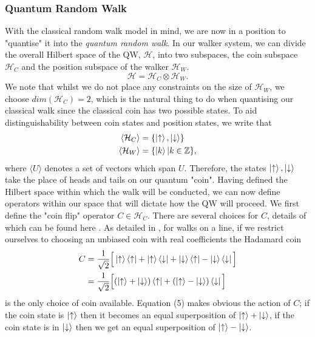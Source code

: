 \subsubsection{Quantum Random Walk}
With the classical random walk model in mind, we are now in a position to "quantise" it into the \emph{quantum random walk}.
In our walker system, we can divide the overall Hilbert space of the QW, $\mathcal{H}$, into two subspaces, the coin subspace $\mathcal{H}_C$ and the position subspace of the walker $\mathcal{H}_W$. 
\begin{equation}
    \mathcal{H} = \mathcal{H}_C \otimes \mathcal{H}_W.
\end{equation}
We note that whilst we do not place any constraints on the size of $\mathcal{H}_W$, we choose $dim(\mathcal{H}_C) = 2$, which is the natural thing to do when quantising our classical walk since the classical coin has two possible states. 
To aid distinguishability between coin states and position states, we write that
\begin{align}
    \langle\mathcal{H}_C\rangle &= \{\ket{\uparrow}, \ket{\downarrow}\}\\
    \langle\mathcal{H}_W\rangle &= \{\ket{k} | k\in\mathbb{Z}\},
\end{align}
where $\langle U \rangle$ denotes a set of vectors which span $U$. 
Therefore, the states $\ket{\uparrow}, \ket{\downarrow}$ take the place of heads and tails on our quantum "coin". 
Having defined the Hilbert space within which the walk will be conducted, we can now define operators within our space that will dictate how the QW will proceed. We first define the "coin flip" operator $C\in \mathcal{H}_C$. 
There are several choices for $C$, details of which can be found here \cite{Tregenna2003}. 
As detailed in \cite{Tregenna2003}, for walks on a line, if we restrict ourselves to choosing an unbiased coin with real coefficients the Hadamard coin
\begin{align}
    C &= \frac{1}{\sqrt{2}}\Big[
    \ket{\uparrow}\bra{\uparrow} +
    \ket{\uparrow}\bra{\downarrow} +
    \ket{\downarrow}\bra{\uparrow} -
    \ket{\downarrow}\bra{\downarrow}\Big]\\
    &= \frac{1}{\sqrt{2}}\Big[(\ket{\uparrow} + \ket{\downarrow})\bra{\uparrow} +
    (\ket{\uparrow} - \ket{\downarrow})\bra{\downarrow}\Big]
\end{align}
is the only choice of coin available. 
Equation (5) makes obvious the action of $C$; if the coin state is $\ket{\uparrow}$ then it becomes an equal superposition of $\ket{\uparrow} + \ket{\downarrow}$, if the coin state is in $\ket{\downarrow}$ then we get an equal superposition of $\ket{\uparrow} - \ket{\downarrow}$. 
